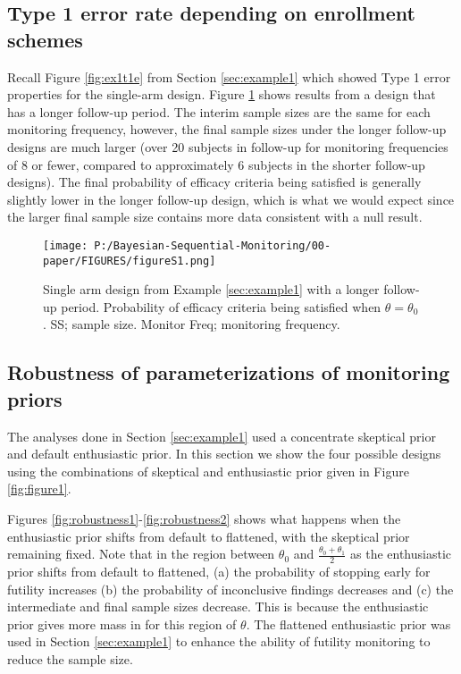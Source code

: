 \documentclass[12pt]{article}
\begin{document}
\subsection{Type 1 error rate depending on enrollment schemes}
Recall Figure \ref{fig:ex1t1e} from Section \ref{sec:example1} which showed Type 1 error properties for the single-arm design. Figure \ref{fig:ex1t1e_longer} shows results from a design that has a longer follow-up period. The interim sample sizes are the same for each monitoring frequency, however, the final sample sizes under the longer follow-up designs are much larger (over 20 subjects in follow-up for monitoring frequencies of 8 or fewer, compared to approximately 6 subjects in the shorter follow-up designs). The final probability of efficacy criteria being satisfied is generally slightly lower in the longer follow-up design, which is what we would expect since the larger final sample size contains more data consistent with a null result.
\begin{figure}\begin{center}

   \texttt{[image: P:/Bayesian-Sequential-Monitoring/00-paper/FIGURES/figureS1.png]}
    \caption{Single arm design from Example \ref{sec:example1} with a longer follow-up period. Probability of efficacy criteria being satisfied when $\theta=\theta_0$. SS; sample size. Monitor Freq; monitoring frequency.}
	\label{fig:ex1t1e_longer}

\end{center}\end{figure}


\subsection{Robustness of parameterizations of monitoring priors}\label{sec:priorRobustness}
The analyses done in Section \ref{sec:example1} used a concentrate skeptical prior and default enthusiastic prior. In this section we show the four possible designs using the combinations of skeptical and enthusiastic prior given in Figure \ref{fig:figure1}.

Figures \ref{fig:robustness1}-\ref{fig:robustness2} shows what happens when the enthusiastic prior shifts from default to flattened, with the skeptical prior remaining fixed. Note that in the region between $\theta_0$ and $\frac{\theta_0+\theta_1}{2}$ as the enthusiastic prior shifts from default to flattened, (a) the probability of stopping early for futility increases (b) the probability of inconclusive findings decreases and (c) the intermediate and final sample sizes decrease. This is because the enthusiastic prior gives more mass in for this region of $\theta$. The flattened enthusiastic prior was used in Section \ref{sec:example1} to enhance the ability of futility monitoring to reduce the sample size.
\end{document}

